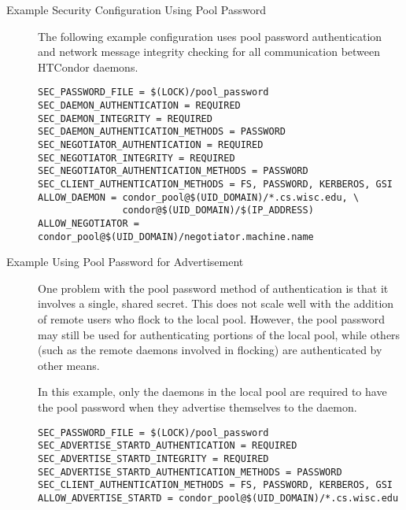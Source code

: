 \begin{description}
\item[Example Security Configuration Using Pool Password]
The following example configuration uses pool password authentication and
network message integrity checking for all communication between HTCondor
daemons.

\begin{verbatim}
SEC_PASSWORD_FILE = $(LOCK)/pool_password
SEC_DAEMON_AUTHENTICATION = REQUIRED
SEC_DAEMON_INTEGRITY = REQUIRED
SEC_DAEMON_AUTHENTICATION_METHODS = PASSWORD
SEC_NEGOTIATOR_AUTHENTICATION = REQUIRED
SEC_NEGOTIATOR_INTEGRITY = REQUIRED
SEC_NEGOTIATOR_AUTHENTICATION_METHODS = PASSWORD
SEC_CLIENT_AUTHENTICATION_METHODS = FS, PASSWORD, KERBEROS, GSI
ALLOW_DAEMON = condor_pool@$(UID_DOMAIN)/*.cs.wisc.edu, \
               condor@$(UID_DOMAIN)/$(IP_ADDRESS)
ALLOW_NEGOTIATOR = condor_pool@$(UID_DOMAIN)/negotiator.machine.name
\end{verbatim}


\item[Example Using Pool Password for  Advertisement]

One problem with the pool password method of authentication is that it
involves a single, shared secret.
This does not scale well with the addition of
remote users who flock to the local pool.
However, the pool password may still be used for authenticating portions
of the local pool, while others
(such as the remote  daemons involved in flocking)
are authenticated by other means.

In this example, only the  daemons in the local pool
are required to have the
pool password when they advertise themselves to the  daemon.

\begin{verbatim}
SEC_PASSWORD_FILE = $(LOCK)/pool_password
SEC_ADVERTISE_STARTD_AUTHENTICATION = REQUIRED
SEC_ADVERTISE_STARTD_INTEGRITY = REQUIRED
SEC_ADVERTISE_STARTD_AUTHENTICATION_METHODS = PASSWORD
SEC_CLIENT_AUTHENTICATION_METHODS = FS, PASSWORD, KERBEROS, GSI
ALLOW_ADVERTISE_STARTD = condor_pool@$(UID_DOMAIN)/*.cs.wisc.edu
\end{verbatim}

\end{description}

